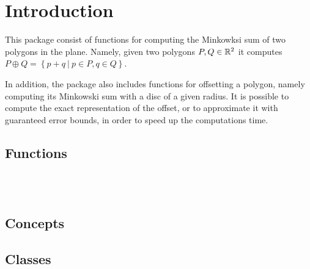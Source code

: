 \clearpage
{}
\label{chapterMinkowskiSumRef}

\section*{Introduction}
\label{mink_ref_sec:intro}

This package consist of functions for computing the Minkowksi sum
of two polygons in the plane. Namely, given two polygons $P,Q \in
\mathbb{R}^2$ it computes $P \oplus Q = \left\{ p + q ~|~ p \in P,
q \in Q \right\}$.

In addition, the package also includes functions for offsetting a
polygon, namely computing its Minkowski sum with a disc of a given
radius. It is possible to compute the exact representation of the
offset, or to approximate it with guaranteed error bounds, in order
to speed up the computations time.

\subsection*{Functions}

\\
\\

\subsection*{Concepts}


\subsection*{Classes}

\\
\\
\\
\\

